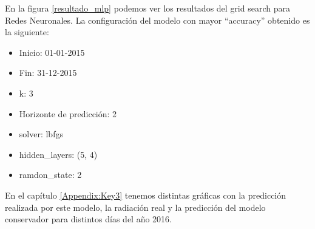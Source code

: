 En la figura \ref{resultado_mlp} podemos ver los resultados del grid search para Redes Neuronales. La configuración del modelo con mayor ``accuracy'' obtenido es la siguiente:

\begin{itemize}
\item Inicio: 01-01-2015
\item Fin: 31-12-2015
\item k: 3
\item Horizonte de predicción: 2
\item solver: lbfgs
\item hidden\_layers: (5, 4)
\item ramdon\_state: 2
\end{itemize}

En el capítulo \ref{Appendix:Key3} tenemos distintas gráficas con la predicción realizada por este modelo, la radiación real y la predicción del modelo conservador para distintos días del año 2016.